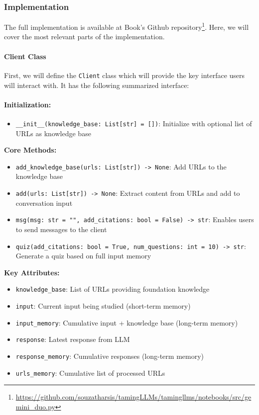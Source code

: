 \subsubsection{Implementation}

The full implementation is available at Book's Github repository\footnote{\url{https://github.com/souzatharsis/tamingLLMs/tamingllms/notebooks/src/gemini_duo.py}}. Here, we will cover the most relevant parts of the implementation.

\paragraph{Client Class}

First, we will define the \texttt{Client} class which will provide the key interface users will interact with. It has the following summarized interface:

\paragraph{Initialization:}
\begin{itemize}
\item \texttt{\_\_init\_\_(knowledge\_base: List[str] = [])}: Initialize with optional list of URLs as knowledge base
\end{itemize}

\textbf{Core Methods:}
\begin{itemize}
\item \texttt{add\_knowledge\_base(urls: List[str]) -> None}: Add URLs to the knowledge base
\item \texttt{add(urls: List[str]) -> None}: Extract content from URLs and add to conversation input  
\item \texttt{msg(msg: str = "", add\_citations: bool = False) -> str}: Enables users to send messages to the client
\item \texttt{quiz(add\_citations: bool = True, num\_questions: int = 10) -> str}: Generate a quiz based on full input memory
\end{itemize}

\textbf{Key Attributes:}
\begin{itemize}
\item \texttt{knowledge\_base}: List of URLs providing foundation knowledge
\item \texttt{input}: Current input being studied (short-term memory)
\item \texttt{input\_memory}: Cumulative input + knowledge base (long-term memory)
\item \texttt{response}: Latest response from LLM
\item \texttt{response\_memory}: Cumulative responses (long-term memory)
\item \texttt{urls\_memory}: Cumulative list of processed URLs
\end{itemize}

